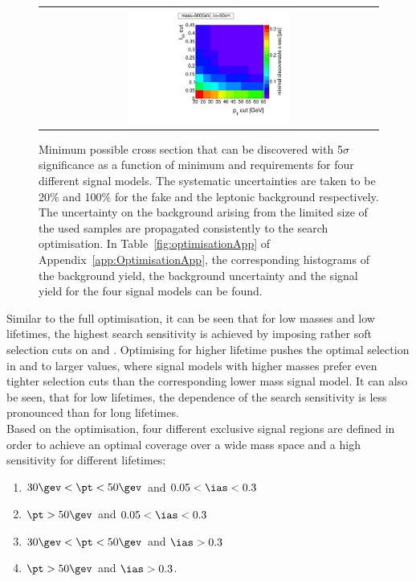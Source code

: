 \begin{figure}[!h]
\begin{tabular}{c}
    \includegraphics[width=0.49\textwidth]{figures/analysis_2/Optimisation/Madgraph_signal_mass_500_ctau_50cm_ECaloLe5_SOverDeltaBStatPlusSys.pdf} 
  \end{tabular}
  \caption{Minimum possible cross section that can be discovered with 5$\sigma$ significance as a function of minimum \pt and \ias requirements for four different signal models.
           The systematic uncertainties are taken to be 20\% and 100\% for the fake and the leptonic background respectively.
           The uncertainty on the background arising from the limited size of the used samples are propagated consistently to the search optimisation.
           In Table~\ref{fig:optimisationApp} of Appendix~\ref{app:OptimisationApp}, the corresponding histograms of the background yield, the background uncertainty and the signal yield for the four signal models can be found.}
  \vspace{10pt}
  \label{fig:optimisation}
\end{figure}
Similar to the full optimisation, it can be seen that for low masses and low lifetimes, the highest search sensitivity is achieved by imposing rather soft selection cuts on \ias and \pt.
Optimising for higher lifetime pushes the optimal selection in \pt and \ias to larger values, where signal models with higher masses prefer even tighter \ias selection cuts than the corresponding lower mass signal model.
It can also be seen, that for low lifetimes, the \pt dependence of the search sensitivity is less pronounced than for long lifetimes.\\


Based on the optimisation, four different exclusive signal regions are defined in order to achieve an optimal coverage over a wide mass space and a high sensitivity for different lifetimes:
\begin{enumerate}[1.)]
\item $30\gev<\pt<50\gev$ and $0.05<\ias<0.3$
\item $\pt>50\gev$ and $0.05<\ias<0.3$
\item $30\gev<\pt<50\gev$ and $\ias>0.3$
\item $\pt>50\gev$ and $\ias>0.3$.
\end{enumerate}


